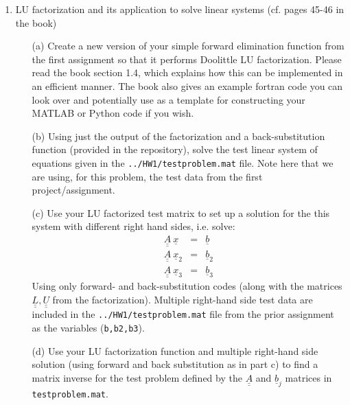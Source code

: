 \documentclass{article}
\begin{document}
\begin{enumerate}
  \item LU factorization and its application to solve linear systems (cf. pages 45-46 in the book)
  \begin{itemize}
    \item[(a)] Create a new version of your simple forward elimination function from the first assignment so that it performs Doolittle LU factorization.  Please read the book section 1.4, which explains how this can be implemented in an efficient manner.  The book also gives an example fortran code you can look over and potentially use as a template for constructing your MATLAB or Python code if you wish.  
    \item[(b)] Using just the output of the factorization and a back-substitution function (provided in the repository), solve the test linear system of equations given in the \texttt{../HW1/testproblem.mat} file.  Note here that we are using, for this problem, the test data from the first project/assignment.  
    \item[(c)] Use your LU factorized test matrix to set up a solution for the this system with different right hand sides, i.e. solve:
    \begin{eqnarray}
      \underline{\underline{A}} ~\underline{x} &=& \underline{b} \\
      \underline{\underline{A}} ~\underline{x}_2 &=& \underline{b}_2 \\
      \underline{\underline{A}} ~\underline{x}_3 &=& \underline{b}_3    
    \end{eqnarray}   
    Using only forward- and back-substitution codes (along with the matrices $\underline{\underline{L}}, \underline{\underline{U}}$ from the factorization).  Multiple right-hand side test data are included in the \texttt{../HW1/testproblem.mat} file from the prior assignment as the variables (\texttt{b,b2,b3}).
    \item[(d)] Use your LU factorization function and multiple right-hand side solution (using forward and back substitution as in part c) to find a matrix inverse for the test problem defined by the $\underline{\underline{A}}$ and  $\underline{b}_j$ matrices in \texttt{testproblem.mat}.  
  \end{itemize}
  

\end{enumerate}
\end{document}
